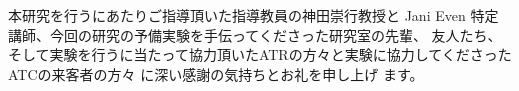 \documentclass{kuisthesis}
\begin{document}
\acknowledgments %
本研究を行うにあたりご指導頂いた指導教員の神田崇行教授と Jani Even
特定講師、今回の研究の予備実験を手伝ってくださった研究室の先輩、
友人たち、そして実験を行うに当たって協力頂いたATRの方々と実験に協力してくださったATCの来客者の方々
に深い感謝の気持ちとお礼を申し上げ
ます。


\end{document}
